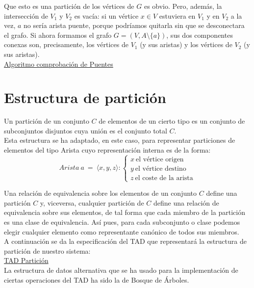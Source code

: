 Que esto es una partición de los vértices de $G$ es obvio. Pero, además, la intersección de $V_1$ y $V_2$ es vacía: si un vértice $x \in V$ estuviera en $V_1$ y en $V_2$ a la vez, $a$ no sería arista puente, porque podríamos quitarla sin que se desconectara el grafo. Si ahora formamos el grafo $G = (V, A \setminus \{a\})$, sus dos componentes conexas son, precisamente, los vértices de $V_1$ (y sus aristas) y los vértices de $V_2$ (y sus aristas).\\

\underline{Algoritmo comprobación de Puentes}\\



\section{Estructura de partición}

Un partición de un conjunto $C$ de elementos de un cierto tipo es un conjunto de subconjuntos disjuntos cuya unión es el conjunto total $C$.\\
Esta estructura se ha adaptado, en este caso, para representar particiones de elementos del tipo Arista cuyo representación interna es de la forma:
\[ Arista\ a\ =\ \langle x,y,z \rangle:
\left\{ 
\begin{array}{l}
x\ \mbox{el vértice origen}\\
y\ \mbox{el vértice destino}\\
z\ \mbox{el coste de la arista} 
\end{array}
\right. \]

Una relación de equivalencia sobre los elementos de un conjunto $C$ define una partición $C$ y, viceversa, cualquier partición de $C$ define una relación de equivalencia sobre sus elementos, de tal forma que cada miembro de la partición es una clase de equivalencia. Así pues, para cada subconjunto o clase podemos elegir cualquier elemento como representante canónico de todos sus miembros.\\

A continuación se da la especificación del TAD que representará la estructura de partición de nuestro sistema:\\

\underline{TAD Partición}\\


La estructura de datos alternativa que se ha usado para la implementación de ciertas operaciones del TAD ha sido la de Bosque de Árboles. \\

